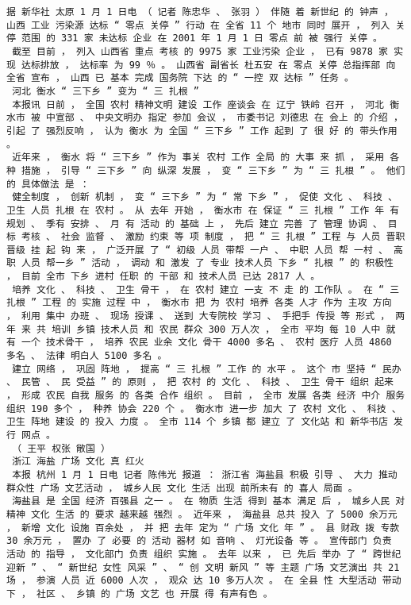 \documentclass{article}
\begin{document}
\begin{Verbatim}[commandchars=\\\{\}]
 据 新华社 太原 1 月 1 日电 （ 记者 陈忠华 、 张羽 ） 伴随 着 新世纪 的 钟声 ， 山西 工业 污染源 达标 “ 零点 关停 ” 行动 在 全省 11 个 地市 同时 展开 ， 列入 关停 范围 的 331 家 未达标 企业 在 2001 年 1 月 1 日 零点 前 被 强行 关停 。 
 截至 目前 ， 列入 山西省 重点 考核 的 9975 家 工业污染 企业 ， 已有 9878 家 实现 达标排放 ， 达标率 为 99 ％ 。 山西省 副省长 杜五安 在 零点 关停 总指挥部 向 全省 宣布 ， 山西 已 基本 完成 国务院 下达 的 “ 一控 双 达标 ” 任务 。 
 河北 衡水 “ 三下乡 ” 变为 “ 三 扎根 ” 
 本报讯 日前 ， 全国 农村 精神文明 建设 工作 座谈会 在 辽宁 铁岭 召开 ， 河北 衡水市 被 中宣部 、 中央文明办 指定 参加 会议 ， 市委书记 刘德忠 在 会上 的 介绍 ， 引起 了 强烈反响 ， 认为 衡水 为 全国 “ 三下乡 ” 工作 起到 了 很 好 的 带头作用 。 
 近年来 ， 衡水 将 “ 三下乡 ” 作为 事关 农村 工作 全局 的 大事 来 抓 ， 采用 各种 措施 ， 引导 “ 三下乡 ” 向 纵深 发展 ， 变 “ 三下乡 ” 为 “ 三 扎根 ” 。 他们 的 具体做法 是 ： 
 健全制度 ， 创新 机制 ， 变 “ 三下乡 ” 为 “ 常 下乡 ” ， 促使 文化 、 科技 、 卫生 人员 扎根 在 农村 。 从 去年 开始 ， 衡水市 在 保证 “ 三 扎根 ” 工作 年 有 规划 、 季有 安排 、 月 有 活动 的 基础 上 ， 先后 建立 完善 了 管理 协调 、 目标 考核 、 社会 监督 、 激励 约束 等 项 制度 ， 把 “ 三 扎根 ” 工程 与 人员 晋职 晋级 挂 起 钩 来 ， 广泛开展 了 “ 初级 人员 带帮 一户 、 中职 人员 帮 一村 、 高职 人员 帮一乡 ” 活动 ， 调动 和 激发 了 专业 技术人员 下乡 “ 扎根 ” 的 积极性 ， 目前 全市 下乡 进村 任职 的 干部 和 技术人员 已达 2817 人 。 
 培养 文化 、 科技 、 卫生 骨干 ， 在 农村 建立 一支 不 走 的 工作队 。 在 “ 三 扎根 ” 工程 的 实施 过程 中 ， 衡水市 把 为 农村 培养 各类 人才 作为 主攻 方向 ， 利用 集中 办班 、 现场 授课 、 送到 大专院校 学习 、 手把手 传授 等 形式 ， 两年 来 共 培训 乡镇 技术人员 和 农民 群众 300 万人次 ， 全市 平均 每 10 人中 就 有 一个 技术骨干 ， 培养 农民 业余 文化 骨干 4000 多名 、 农村 医疗 人员 4860 多名 、 法律 明白人 5100 多名 。 
 建立 网络 ， 巩固 阵地 ， 提高 “ 三 扎根 ” 工作 的 水平 。 这个 市 坚持 “ 民办 、 民管 、 民 受益 ” 的 原则 ， 把 农村 的 文化 、 科技 、 卫生 骨干 组织 起来 ， 形成 农民 自我 服务 的 各类 合作 组织 。 目前 ， 全市 发展 各类 经济 中介 服务 组织 190 多个 ， 种养 协会 220 个 。 衡水市 进一步 加大 了 农村 文化 、 科技 、 卫生 阵地 建设 的 投入 力度 。 全市 114 个 乡镇 都 建立 了 文化站 和 新华书店 发行 网点 。 
 （ 王平 权张 敞国 ） 
 浙江 海盐 广场 文化 真 红火 
 本报 杭州 1 月 1 日电 记者 陈伟光 报道 ： 浙江省 海盐县 积极 引导 、 大力 推动 群众性 广场 文艺活动 ， 城乡人民 文化 生活 出现 前所未有 的 喜人 局面 。 
 海盐县 是 全国 经济 百强县 之一 。 在 物质 生活 得到 基本 满足 后 ， 城乡人民 对 精神 文化 生活 的 要求 越来越 强烈 。 近年来 ， 海盐县 总共 投入 了 5000 余万元 ， 新增 文化 设施 百余处 ， 并 把 去年 定为 “ 广场 文化 年 ” 。 县 财政 拨 专款 30 余万元 ， 置办 了 必要 的 活动 器材 如 音响 、 灯光设备 等 。 宣传部门 负责 活动 的 指导 ， 文化部门 负责 组织 实施 。 去年 以来 ， 已 先后 举办 了 “ 跨世纪 迎新 ” 、 “ 新世纪 女性 风采 ” 、 “ 创 文明 新风 ” 等 主题 广场 文艺演出 共 21 场 ， 参演 人员 近 6000 人次 ， 观众 达 10 多万人次 。 在 全县 性 大型活动 带动 下 ， 社区 、 乡镇 的 广场 文艺 也 开展 得 有声有色 。 

\end{Verbatim}
\end{document}
